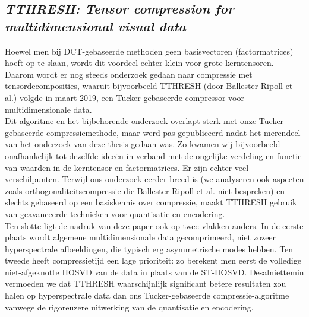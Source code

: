 \subsection{\textit{TTHRESH: Tensor compression for multidimensional visual data}}

Hoewel men bij DCT-gebaseerde methoden geen basisvectoren (factormatrices) hoeft op te slaan, wordt dit voordeel echter klein voor grote kerntensoren. Daarom wordt er nog steeds onderzoek gedaan naar compressie met tensordecomposities, waaruit bijvoorbeeld TTHRESH (door Ballester-Ripoll et al.) \cite{ref:tthresh} volgde in maart 2019, een Tucker-gebaseerde compressor voor multidimensionale data.\\

Dit algoritme en het bijbehorende onderzoek overlapt sterk met onze Tucker-gebaseerde compressiemethode, maar werd pas gepubliceerd nadat het merendeel van het onderzoek van deze thesis gedaan was. Zo kwamen wij bijvoorbeeld onafhankelijk tot dezelfde idee\"en in verband met de ongelijke verdeling en functie van waarden in de kerntensor en factormatrices. Er zijn echter veel verschilpunten. Terwijl ons onderzoek eerder breed is (we analyseren ook aspecten zoals orthogonaliteitscompressie die Ballester-Ripoll et al. niet bespreken) en slechts gebaseerd op een basiskennis over compressie, maakt TTHRESH gebruik van geavanceerde technieken voor quantisatie en encodering.\\

Ten slotte ligt de nadruk van deze paper ook op twee vlakken anders. In de eerste plaats wordt algemene multidimensionale data gecomprimeerd, niet zozeer hyperspectrale afbeeldingen, die typisch erg asymmetrische modes hebben. Ten tweede heeft compressietijd een lage prioriteit: zo berekent men eerst de volledige niet-afgeknotte HOSVD van de data in plaats van de ST-HOSVD. Desalniettemin vermoeden we dat TTHRESH waarschijnlijk significant betere resultaten zou halen op hyperspectrale data dan ons Tucker-gebaseerde compressie-algoritme vanwege de rigoreuzere uitwerking van de quantisatie en encodering.
